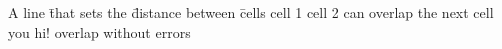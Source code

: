 \documentclass{article}
\begin{document}
\vspace*{\fill} \vspace*{-5ex}

\begin{tabbing}
A line \= that sets the \=distance between \= cells\kill
cell 1 \> cell 2 \> can overlap the next cell\\
you \> hi! \> overlap without errors \\
\end{tabbing}

\vspace*{\fill}
\end{document}
